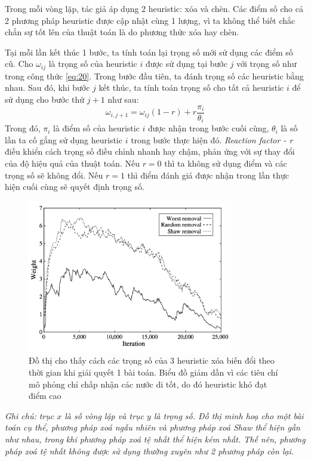 Trong mỗi vòng lặp, tác giả áp dụng 2 heuristic: xóa và chèn. Các điểm số cho cả 2 phương pháp heuristic được cập nhật cùng 1 lượng, vì ta không thể biết chắc chắn sự tốt lên của thuật toán là do phương thức xóa hay chèn.

Tại mỗi lần kết thúc 1 bước, ta tính toán lại trọng số mới sử dụng các điểm số cũ. Cho $\omega_{ij}$ là trọng số của heuristic $i$ được sử dụng tại bước $j$ với trọng số như trong công thức \ref{eq:20}. Trong bước đầu tiên, ta đánh trọng số các heuristic bằng nhau. Sau đó, khi bước $j$ kết thúc, ta tính toán trọng số cho tất cả heuristic $i$ để sử dụng cho bước thứ $j + 1$ như sau:
\begin{equation}
    \omega_{i, j+1} = \omega_{ij}(1-r)+r\frac{\pi_i}{\theta_i}
\end{equation}
Trong đó, $\pi_i$ là điểm số của heuristic $i$ được nhận trong bước cuối cùng, $\theta_i$ là số lần ta cố gắng sử dụng heuristic $i$ trong bước thực hiện đó. \textit{Reaction factor - r} điều khiển cách trọng số điều chỉnh nhanh hay chậm, phản ứng với sự thay đổi của độ hiệu quả của thuật toán. Nếu $r = 0$ thì ta không sử dụng điểm và các trọng số sẽ không đổi. Nếu $r = 1$ thì điểm đánh giá được nhận trong lần thực hiện cuối cùng sẽ quyết định trọng số.

\begin{figure}[H] %
    \centering %
    \includegraphics[width=0.8\textwidth]{figures/fig-1.png} 
    \caption{Đồ thị cho thấy cách các trọng số của 3 heuristic xóa biến đổi theo thời gian khi giải quyết 1 bài toán. Biểu đồ giảm dần vì các tiêu chí mô phỏng chỉ chấp nhận các nước di tốt, do đó heuristic khó đạt điểm cao} %
    \label{fig:fg_01}
\end{figure}
\textit{Ghi chú: trục $x$ là số vòng lặp và trục $y$ là trọng số. Đồ thị minh hoạ cho một bài toán cụ thể, phương pháp xoá ngẫu nhiên và phương pháp xoá Shaw thể hiện gần như nhau, trong khi phương pháp xoá tệ nhất thể hiện kém nhất. Thế nên, phương pháp xoá tệ nhất không được sử dụng thường xuyên như 2 phương pháp còn lại.}
